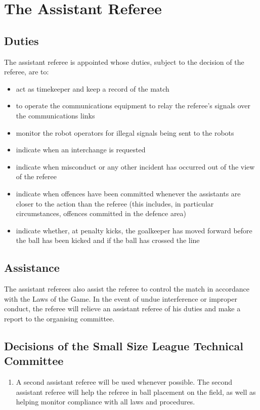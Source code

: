 \section{The Assistant Referee}\label{sec:assistant-referee}

\subsection{Duties}
The assistant referee is appointed whose duties, subject to the decision of the referee, are to:
\begin{itemize}
\item act as timekeeper and keep a record of the match
\item to operate the communications equipment to relay the referee's signals over the communications links
\item monitor the robot operators for illegal signals being sent to the robots
\item indicate when an interchange is requested
\item indicate when misconduct or any other incident has occurred out of the view of the referee
\item indicate when offences have been committed whenever the assistants are closer to the action than the referee (this includes, in particular circumstances, offences committed in the defence area)
\item indicate whether, at penalty kicks, the goalkeeper has moved forward before the ball has been kicked and if the ball has crossed the line
\end{itemize}

\subsection{Assistance}
The assistant referees also assist the referee to control the match in accordance with the Laws of the Game.
In the event of undue interference or improper conduct, the referee will relieve an assistant referee of his duties and make a report to the organising committee.

\subsection*{Decisions of the Small Size League Technical Committee}
\begin{enumerate}
\item
A second assistant referee will be used whenever possible.
The second assistant referee will help the referee in ball placement on the field, as well as helping monitor compliance with all laws and procedures.
\end{enumerate}